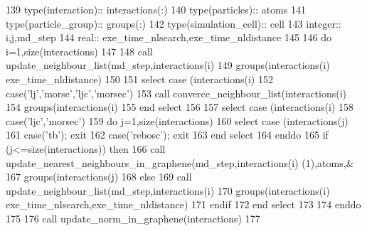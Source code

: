 \begin{DoxyCode}
139     \textcolor{keywordtype}{type}(interaction):: interactions(:)
140     \textcolor{keywordtype}{type}(particles):: atoms
141     \textcolor{keywordtype}{type}(particle\_group):: groups(:)
142     \textcolor{keywordtype}{type}(simulation\_cell):: cell
143     \textcolor{keywordtype}{integer}:: i,j,md\_step
144     \textcolor{keywordtype}{real}:: exe\_time\_nlsearch,exe\_time\_nldistance
145     
146     \textcolor{keywordflow}{do} i=1,\textcolor{keyword}{size}(interactions)
147     
148         \textcolor{keyword}{call }update\_neighbour\_list(md\_step,interactions(i)%
149         groups(interactions(i)%
      exe\_time\_nldistance)
150         
151         \textcolor{keywordflow}{select case} (interactions(i)%
152         \textcolor{keywordflow}{case}(\textcolor{stringliteral}{'lj'},\textcolor{stringliteral}{'morse'},\textcolor{stringliteral}{'ljc'},\textcolor{stringliteral}{'morsec'})
153             \textcolor{keyword}{call }converce\_neighbour\_list(interactions(i)%
154             groups(interactions(i)%
155 \textcolor{keywordflow}{        end select}
156         
157         \textcolor{keywordflow}{select case} (interactions(i)%
158         \textcolor{keywordflow}{case}(\textcolor{stringliteral}{'ljc'},\textcolor{stringliteral}{'morsec'})
159             \textcolor{keywordflow}{do} j=1,\textcolor{keyword}{size}(interactions)
160                 \textcolor{keywordflow}{select case} (interactions(j)%
161                 \textcolor{keywordflow}{case}(\textcolor{stringliteral}{'tb'}); \textcolor{keywordflow}{exit}
162                 \textcolor{keywordflow}{case}(\textcolor{stringliteral}{'rebosc'}); \textcolor{keywordflow}{exit}
163 \textcolor{keywordflow}{                end select}
164 \textcolor{keywordflow}{            enddo}
165             \textcolor{keywordflow}{if} (j<=\textcolor{keyword}{size}(interactions)) \textcolor{keywordflow}{then}
166                 \textcolor{keyword}{call }update\_nearest\_neighbours\_in\_graphene(md\_step,interactions(i)%
      (1),atoms,&
167                 groups(interactions(j)%
168             \textcolor{keywordflow}{else}
169                 \textcolor{keyword}{call }update\_neighbour\_list(md\_step,interactions(i)%
170                 groups(interactions(i)%
      exe\_time\_nlsearch,exe\_time\_nldistance)
171 \textcolor{keywordflow}{            endif}
172 \textcolor{keywordflow}{        end select}
173         
174 \textcolor{keywordflow}{    enddo}
175     
176     \textcolor{keyword}{call }update\_norm\_in\_graphene(interactions)
177     
\end{DoxyCode}
